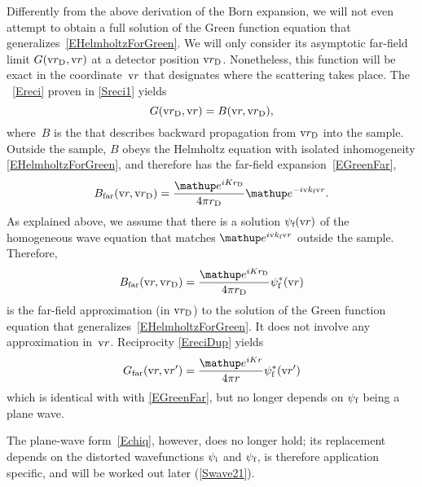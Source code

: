 Differently from the above derivation of the Born expansion,
we will not even attempt to obtain a full solution
%
of the Green function equation that generalizes~\cref{EHelmholtzForGreen}.
We will only consider its asymptotic far-field limit $G(\rD,\r)$
at a detector position $\rD$.
Nonetheless, this function will be exact in the coordinate~$\r$
that designates where the scattering takes place.
%
The ~\cref{Ereci}
%
proven in \cref{Sreci1}
yields
\begin{equation}\label{EreciDup}
  G(\rD,\r) = B(\r,\rD),
\end{equation}
%
where~$B$ is the 
that describes backward propagation from $\rD$ into the sample.
Outside the sample,
$B$ obeys the Helmholtz equation
with isolated inhomogeneity \cref{EHelmholtzForGreen},
and therefore has the far-field expansion~\cref{EGreenFar},
%
\begin{equation}\label{EBFar}
  B_\text{far}(\r,\rD)
  =\frac{\e^{iKr_\text{D}}}{4\pi r_\text{D}}\e^{-i\k_\sf \r}.
\end{equation}
As explained above,
we assume that there is a solution $\psi_\sf(\r)$ of the homogeneous
wave equation that matches $\e^{i\k_\sf \r}$ outside the sample.
Therefore,
\begin{equation}\label{EBFull}
  B_\text{far}(\r,\rD)
  = \frac{\e^{iKr_\text{D}}}{4\pi r_\text{D}}\psi^*_\sf(\r)
\end{equation}
is the far-field approximation (in $\rD$)
to the solution of the Green function equation that generalizes~\cref{EHelmholtzForGreen}.
It does not involve any approximation in~$\r$.
Reciprocity \cref{EreciDup} yields
\begin{equation}\label{EGreenFarDWBA}
  G_\text{far}(\r,\r')
  = \frac{\e^{iKr}}{4\pi r}\psi^*_\sf(\r')
\end{equation}
which is identical with with \cref{EGreenFar},
but no longer depends on $\psi_\sf$ being a plane wave.

The plane-wave form~\cref{Echiq}, however, does no longer hold;
its replacement depends on the distorted wavefunctions
$\psi_\si$ and $\psi_\sf$,
is therefore application specific,
and will be worked out later (\cref{Swave21}).

